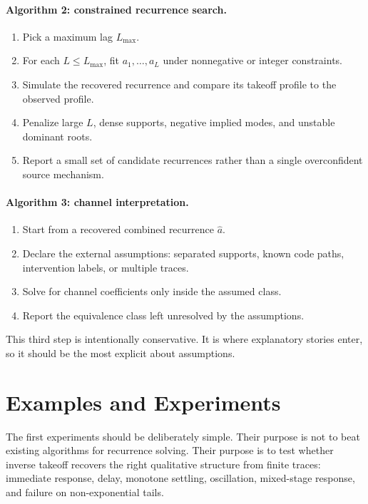 \documentclass[10pt,twocolumn]{article}
\begin{document}
\paragraph{Algorithm 2: constrained recurrence search.}
\begin{enumerate}
    \item Pick a maximum lag \(L_{\max}\).
    \item For each \(L\le L_{\max}\), fit \(a_1,\ldots,a_L\) under
    nonnegative or integer constraints.
    \item Simulate the recovered recurrence and compare its takeoff profile to
    the observed profile.
    \item Penalize large \(L\), dense supports, negative implied modes, and
    unstable dominant roots.
    \item Report a small set of candidate recurrences rather than a single
    overconfident source mechanism.
\end{enumerate}

\paragraph{Algorithm 3: channel interpretation.}
\begin{enumerate}
    \item Start from a recovered combined recurrence \(\widehat a\).
    \item Declare the external assumptions: separated supports, known code
    paths, intervention labels, or multiple traces.
    \item Solve for channel coefficients only inside the assumed class.
    \item Report the equivalence class left unresolved by the assumptions.
\end{enumerate}
This third step is intentionally conservative. It is where explanatory stories
enter, so it should be the most explicit about assumptions.

\section{Examples and Experiments}

The first experiments should be deliberately simple. Their purpose is not to
beat existing algorithms for recurrence solving. Their purpose is to test
whether inverse takeoff recovers the right qualitative structure from finite
traces: immediate response, delay, monotone settling, oscillation, mixed-stage
response, and failure on non-exponential tails.
\end{document}

